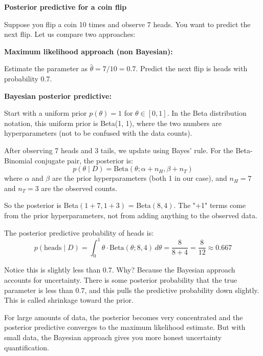 \begin{examplebox}
\textbf{Posterior predictive for a coin flip}

\vspace{0.5em}

Suppose you flip a coin 10 times and observe 7 heads. You want to predict the next flip. Let us compare two approaches:

\vspace{0.5em}

\textbf{Maximum likelihood approach (non Bayesian):}

Estimate the parameter as $\hat{\theta} = 7/10 = 0.7$. Predict the next flip is heads with probability 0.7.

\vspace{0.5em}

\textbf{Bayesian posterior predictive:}

Start with a uniform prior $p(\theta) = 1$ for $\theta \in [0, 1]$. In the Beta distribution notation, this uniform prior is Beta(1, 1), where the two numbers are hyperparameters (not to be confused with the data counts).

After observing 7 heads and 3 tails, we update using Bayes' rule. For the Beta-Binomial conjugate pair, the posterior is:
\begin{equation*}
p(\theta \mid D) = \text{Beta}(\theta; \alpha + n_H, \beta + n_T)
\end{equation*}
where $\alpha$ and $\beta$ are the prior hyperparameters (both 1 in our case), and $n_H = 7$ and $n_T = 3$ are the observed counts.

So the posterior is Beta$(1 + 7, 1 + 3)$ = Beta$(8, 4)$. The "+1" terms come from the prior hyperparameters, not from adding anything to the observed data.

The posterior predictive probability of heads is:
\begin{equation*}
p(\text{heads} \mid D) = \int_{0}^{1} \theta \cdot \text{Beta}(\theta; 8, 4) \, d\theta = \frac{8}{8+4} = \frac{8}{12} \approx 0.667
\end{equation*}

Notice this is slightly less than 0.7. Why? Because the Bayesian approach accounts for uncertainty. There is some posterior probability that the true parameter is less than 0.7, and this pulls the predictive probability down slightly. This is called shrinkage toward the prior.

\vspace{0.5em}

For large amounts of data, the posterior becomes very concentrated and the posterior predictive converges to the maximum likelihood estimate. But with small data, the Bayesian approach gives you more honest uncertainty quantification.
\end{examplebox}

